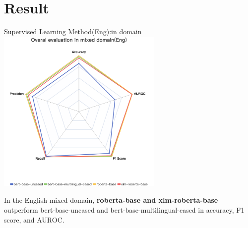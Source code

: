 \documentclass[serif]{beamer}
\begin{document}
\section{Result}
\begin{frame}{Supervised Learning Method(Eng):in domain}
\centering
\includegraphics[width=0.6\textwidth]{images/Overal evaluation in mixed domain(Eng).png}

\begin{flushleft}
\scriptsize
In the English mixed domain, \textbf{roberta-base and xlm-roberta-base} outperform bert-base-uncased and bert-base-multilingual-cased in accuracy, F1 score, and AUROC.
\normalize
\end{flushleft}
\end{frame}
\end{document}
